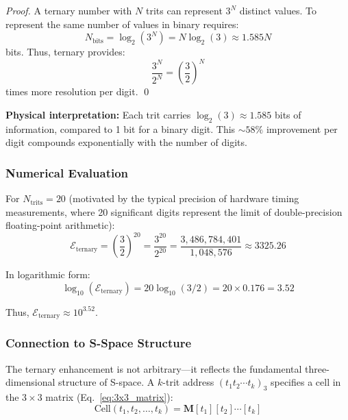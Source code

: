 \documentclass[twocolumn,10pt]{article}
\theoremstyle{remark}
\begin{document}
\begin{proof}
A ternary number with $N$ trits can represent $3^N$ distinct values. To represent the same number of values in binary requires:
\begin{equation}
    N_{\text{bits}} = \log_2(3^N) = N \log_2(3) \approx 1.585 N
    \label{eq:bits_from_trits}
\end{equation}
bits. Thus, ternary provides:
\begin{equation}
    \frac{3^N}{2^N} = \left(\frac{3}{2}\right)^N
    \label{eq:ternary_advantage}
\end{equation}
times more resolution per digit. \qed
\end{proof}

\textbf{Physical interpretation:} Each trit carries $\log_2(3) \approx 1.585$ bits of information, compared to 1 bit for a binary digit. This $\sim 58\%$ improvement per digit compounds exponentially with the number of digits.

\subsubsection{Numerical Evaluation}

For $N_{\text{trits}} = 20$ (motivated by the typical precision of hardware timing measurements, where 20 significant digits represent the limit of double-precision floating-point arithmetic):
\begin{equation}
    \mathcal{E}_{\text{ternary}} = \left(\frac{3}{2}\right)^{20} = \frac{3^{20}}{2^{20}} = \frac{3{,}486{,}784{,}401}{1{,}048{,}576} \approx 3325.26
    \label{eq:ternary_numerical}
\end{equation}

In logarithmic form:
\begin{equation}
    \log_{10}(\mathcal{E}_{\text{ternary}}) = 20 \log_{10}(3/2) = 20 \times 0.176 = 3.52
    \label{eq:ternary_log}
\end{equation}

Thus, $\mathcal{E}_{\text{ternary}} \approx 10^{3.52}$.

\subsubsection{Connection to S-Space Structure}

The ternary enhancement is not arbitrary—it reflects the fundamental three-dimensional structure of S-space. A $k$-trit address $(t_1 t_2 \cdots t_k)_3$ specifies a cell in the $3 \times 3$ matrix (Eq.~\ref{eq:3x3_matrix}):
\begin{equation}
    \text{Cell}(t_1, t_2, \ldots, t_k) = \mathbf{M}[t_1][t_2] \cdots [t_k]
    \label{eq:ternary_cell_address}
\end{equation}
\end{document}
